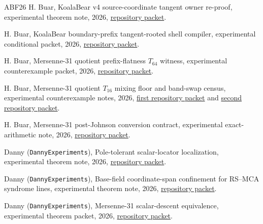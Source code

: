 \documentclass[11pt,a4paper]{amsart}
\numberwithin{equation}{section}
\theoremstyle{remark}
\begin{document}
\begin{thebibliography}{ABF26}
H. Buar,
\newblock KoalaBear v4 source-coordinate tangent owner re-proof,
\newblock experimental theorem note, 2026,
\newblock \href{https://github.com/przchojecki/rs-mca/blob/71f64349a8fa8cbf05678a6e9d4e00e8e06d7de5/experimental/notes/frontier-adjacent/kb_mca_v4_tangent_source_adapter_v1.md}{repository packet}.

H. Buar,
\newblock KoalaBear boundary-prefix tangent-rooted shell compiler,
\newblock experimental conditional packet, 2026,
\newblock \href{https://github.com/przchojecki/rs-mca/pull/1054}{repository packet}.

H. Buar,
\newblock Mersenne-31 quotient prefix-flatness $T_{64}$ witness,
\newblock experimental counterexample packet, 2026,
\newblock \href{https://github.com/przchojecki/rs-mca/pull/1048}{repository packet}.

H. Buar,
\newblock Mersenne-31 quotient $T_{16}$ mixing floor and band-swap census,
\newblock experimental counterexample notes, 2026,
\newblock \href{https://github.com/przchojecki/rs-mca/pull/1055}{first repository packet} and \href{https://github.com/przchojecki/rs-mca/pull/1056}{second repository packet}.

H. Buar,
\newblock Mersenne-31 post-Johnson conversion contract,
\newblock experimental exact-arithmetic note, 2026,
\newblock \href{https://github.com/przchojecki/rs-mca/pull/1057}{repository packet}.

Danny (\texttt{DannyExperiments}),
\newblock Pole-tolerant scalar-locator localization,
\newblock experimental theorem note, 2026,
\newblock \href{https://github.com/przchojecki/rs-mca/blob/71f64349a8fa8cbf05678a6e9d4e00e8e06d7de5/experimental/notes/m2/pole_tolerant_scalar_locator_localization.md}{repository packet}.

Danny (\texttt{DannyExperiments}),
\newblock Base-field coordinate-span confinement for RS--MCA syndrome lines,
\newblock experimental theorem note, 2026,
\newblock \href{https://github.com/przchojecki/rs-mca/blob/71f64349a8fa8cbf05678a6e9d4e00e8e06d7de5/experimental/notes/thresholds/base_field_coordinate_span_confinement.md}{repository packet}.

Danny (\texttt{DannyExperiments}),
\newblock Mersenne-31 scalar-descent equivalence,
\newblock experimental theorem packet, 2026,
\newblock \href{https://github.com/przchojecki/rs-mca/pull/993}{repository packet}.


\end{thebibliography}
\end{document}
